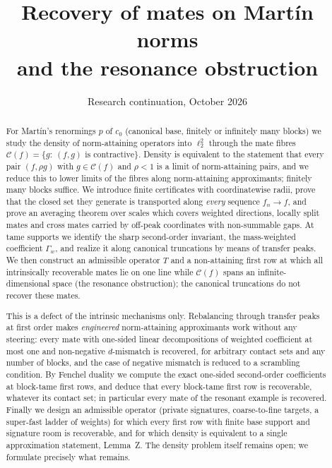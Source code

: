 \documentclass[10pt]{amsart}
\title{Recovery of mates on Mart\'in norms\\and the resonance obstruction}
\author{}
\date{Research continuation, October 2026}
\theoremstyle{definition}
\theoremstyle{remark}
\newcommand{\Cset}{\mathcal C}
\begin{document}
\begin{abstract}
For Mart\'in's renormings $p$ of $c_0$ (canonical base, finitely or
infinitely many blocks) we study the density of norm-attaining operators
into $\ell_2^2$ through the mate fibres
$\Cset(f)=\{g:\ (f,g)\text{ is contractive}\}$.  Density is equivalent to the
statement that every pair $(f,\rho g)$ with $g\in\Cset(f)$ and $\rho<1$ is a
limit of norm-attaining pairs, and we reduce this to lower limits of the
fibres along norm-attaining approximants; finitely many blocks suffice.  We
introduce finite certificates with coordinatewise radii, prove that the
closed set they generate is transported along \emph{every} sequence
$f_n\to f$, and prove an averaging theorem over scales which covers weighted
directions, locally split mates and cross mates carried by off-peak
coordinates with non-summable gaps.  At tame supports we identify the sharp
second-order invariant, the mass-weighted coefficient $\Gamma_w$, and
realize it along canonical truncations by means of transfer peaks.  We then
construct an admissible operator $T$ and a non-attaining first row at which
all intrinsically recoverable mates lie on one line while $\Cset(f)$ spans an
infinite-dimensional space (the resonance obstruction); the canonical
truncations do not recover these mates.

This is a defect of the intrinsic mechanisms only.  Rebalancing through
transfer peaks at first order makes \emph{engineered} norm-attaining
approximants work without any steering: every mate with one-sided linear
decompositions of weighted coefficient at most one and non-negative
$d$-mismatch is recovered, for arbitrary contact sets and any number of
blocks, and the case of negative mismatch is reduced to a scrambling
condition.  By Fenchel duality we compute the exact one-sided second-order
coefficients at block-tame first rows, and deduce that every block-tame
first row is recoverable, whatever its contact set; in particular every mate
of the resonant example is recovered.  Finally we design an admissible
operator (private signatures, coarse-to-fine targets, a super-fast ladder
of weights) for which every first row with finite base support and
signature room is recoverable, and for which density is equivalent to a
single approximation statement, Lemma~Z.  The density problem itself
remains open; we formulate precisely what remains.
\end{abstract}
\maketitle
\tableofcontents
\end{document}
